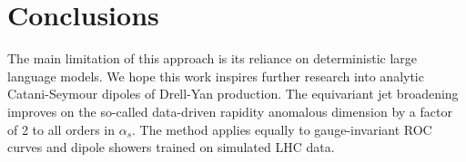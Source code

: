 \section{Conclusions}\label{sec:conclusions}

The main limitation of this approach is its reliance on deterministic
large language models. We hope this work inspires further research into
analytic Catani-Seymour dipoles of Drell-Yan production. The equivariant
jet broadening improves on the so-called data-driven rapidity anomalous
dimension by a factor of 2 to all orders in $\alpha_s$. The method
applies equally to gauge-invariant ROC curves and dipole showers trained
on simulated LHC data.

